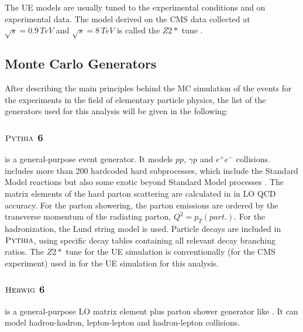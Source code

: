 
The UE models are usually tuned to the experimental conditions and on experimental data. The model derived on the CMS data collected at $\sqrt{s} = 0.9\, TeV$
and $\sqrt{s} = 8\,TeV$ is called the $Z2*$ tune \cite{Chatrchyan:2011id}.


\subsection{Monte Carlo Generators}

After describing the main principles behind the MC simulation of the events for the experiments in the field of elementary particle
physics, the list of the generators used for this analysis will be given in the following:

\subsubsection{$\textsc{Pythia}$ 6}

\PYTHIA \cite{Sjostrand:2006za} is a general-purpose event generator. It models $pp$, $\gamma p$ and $e^{+}e^{-}$ collisions. \PYTHIA includes more than 200 hardcoded
hard subprocesses, which include the Standard Model reactions but also some exotic beyond Standard Model processes \cite{Buckley:2011ms}.
%
The matrix elements of the hard parton scattering are calculated in \PYTHIA in LO QCD accuracy.
%
For the parton showering, the parton emissions are ordered by the transverse momentum of the radiating parton, $Q^{2} = p_{T}(part.)$.
%
For the hadronization, the Lund string model is used.
%
Particle decays are included in $\textsc{Pythia}$, using specific decay tables containing all relevant decay branching ratios.
%
The $Z2*$ tune for the UE simulation is conventionally (for the CMS experiment) used in \PYTHIA for the UE simulation for this analysis.

\subsubsection{$\textsc{Herwig}$ 6}

\HERWIG \cite{Corcella:2000bw} is a general-purpose LO matrix element plus parton shower generator like \PYTHIA. It can model hadron-hadron, 
lepton-lepton and hadron-lepton collisions.

